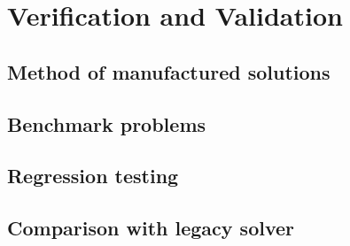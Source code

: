 \chapter{Verification and Validation}
\label{ch:verification}

\section{Method of manufactured solutions}
\label{sec:verify:mms}


\section{Benchmark problems}
\label{sec:verify:benchmarks}


\section{Regression testing}
\label{sec:verify:regression}


\section{Comparison with legacy solver}
\label{sec:verify:legacy}


